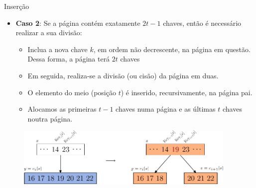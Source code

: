 \documentclass[aspectratio=169]{beamer}
\begin{document}
{\begin{frame}{Inserção}
\begin{itemize}
 \item {\bf Caso 2}: Se a página contém exatamente $2t-1$ chaves, então é necessário realizar a sua divisão:
 \begin{itemize}
 \item Inclua a nova chave $k$, em ordem não decrescente, na página em questão. Dessa forma, a página terá $2t$ chaves
 \item Em seguida, realiza-se a divisão (ou cisão) da página em duas.
 \item O elemento do meio (posição $t$) é inserido, recursivamente, na página pai.
 \item Alocamos as primeiras $t-1$ chaves numa página e as últimas $t$ chaves noutra página.
 \end{itemize} 
\end{itemize}
\begin{figure}[!h]
\centering
   \includegraphics[width=300pt]{imagens/divisao.png}
  \label{fig_divisao}
\end{figure} 
\end{frame}


}
\end{document}
